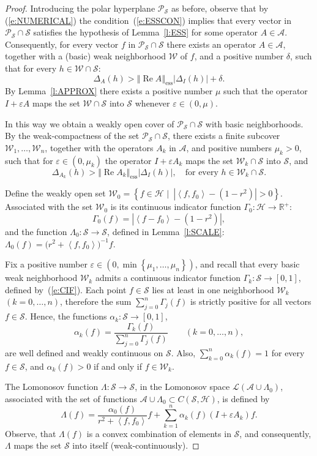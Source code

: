 \documentclass{tran-l}
\theoremstyle{definition}
\theoremstyle{remark}
\numberwithin{equation}{subsection}
\DeclareMathOperator{\RE}{Re}
\DeclareMathOperator{\ess}{ess}
\newcommand{\eps}{\varepsilon}
\newcommand{\To}{\longrightarrow}
\newcommand{\h}{\mathcal{H}}
\newcommand{\s}{\mathcal{S}}
\newcommand{\A}{\mathcal{A}}
\newcommand{\W}{\mathcal{W}}
\newcommand{\Real}{\mathbb{R}}
\newcommand{\RPlus}{\Real^{+}}
\newcommand{\Polar}{\mathcal{P}_{\s}}
\newcommand{\Lom}{\mathcal{L}}
\newcommand{\abs}[1]{\left\vert#1\right\vert}
\newcommand{\set}[1]{\left\{#1\right\}}
\newcommand{\seq}[1]{\left<#1\right>}
\newcommand{\norm}[1]{\left\Vert#1\right\Vert}
\newcommand{\essnorm}[1]{\norm{#1}_{\ess}}
\begin{document}
\begin{proof}
Introducing the polar hyperplane $\Polar$ as before, observe that by (\ref{e:NUMERICAL}) the condition~(\ref{e:ESSCON}) implies that every vector in $\Polar\cap\s$ satisfies the hypothesis of Lemma~\ref{l:ESS} for some operator $A\in\A$. Consequently, for every vector $f$ in $\Polar\cap\s$ there exists an operator $A\in\A$, together with a (basic) weak neighborhood $\W$ of $f$, and a positive number $\delta$, such that for every $h\in\W\cap\s$:
\[ \Delta_A(h) > \essnorm{\RE{A}}\abs{\Delta_I(h)} + \delta. \]
By Lemma~\ref{l:APPROX} there exists a positive number $\mu$ such that the operator $I+\eps A$ maps the set $\W\cap\s$ into $\s$ whenever $\eps\in(0,\mu)$.

In this way we obtain a weakly open cover of $\Polar\cap\s$ with basic neighborhoods. By the weak-compactness of the set $\Polar\cap\s$, there exists a finite subcover $\W_1,\ldots,\W_n$, together with the operators $A_k$ in $\A$, and positive numbers $\mu_k>0$, such that for $\eps\in(0,\mu_k)$ the operator $I+\eps{A_k}$ maps the set $\W_k\cap\s$ into $\s$, and
\begin{equation}\label{e:EINEQ}
  \Delta_{A_k}(h) > \essnorm{\RE{A_k}} \abs{\Delta_I(h)},
  \quad \text{for every $h\in\W_k\cap\s$}.
\end{equation}

Define the weakly open set $\W_0=\set{f\in\h\,\,|\,\,\,\abs{\seq{f,f_0}-(1-r^2)}>0}$. Associated with the set $\W_0$ is its continuous indicator function $\Gamma_0\colon\h\To\RPlus$:
\[ \Gamma_0(f)=\abs{\seq{f-f_0}-(1-r^2)}, \]
and the function $\Lambda_0\colon\s\To\s$, defined in Lemma~\ref{l:SCALE}: $\Lambda_0(f)=\big(r^2+\seq{f,f_0}\big)^{-1}f$.

Fix a positive number $\eps\in(0,\min\set{\mu_1,\ldots,\mu_n})$, and recall that every basic weak neighborhood $\W_k$ admits a continuous indicator function $\Gamma_k\colon\s\To[0,1]$, defined by~(\ref{e:CIF}). Each point $f\in\s$ lies at least in one neighborhood $\W_k$ $(k=0,\ldots,n)$, therefore the sum $\sum_{j=0}^n\Gamma_j(f)$ is strictly positive for all vectors $f\in\s$. Hence, the functions $\alpha_k\colon\s\To[0,1]$,
\[ \alpha_k(f) =
   \frac{\Gamma_k(f)}{\sum_{j=0}^n \Gamma_j(f)} \quad\quad
   (k=0,\ldots,n), \]
are well defined and weakly continuous on $\s$. Also, $\sum_{k=0}^n\alpha_k(f)=1$ for every $f \in \s$, and $\alpha_k(f)>0$ if and only if $f\in\W_k$.

The Lomonosov function $\Lambda\colon\s\To\s$, in the Lomonosov space $\Lom({\A\cup\Lambda_0})$, associated with the set of functions $\A\cup\Lambda_0\subset{C}(\s,\h)$, is defined by
\[ \Lambda(f) = \frac{\alpha_0(f)}{r^2+\seq{f,f_0}}
    f+\sum_{k=1}^n \alpha_k(f) (I+\eps A_k)f. \]
Observe, that $\Lambda(f)$ is a convex combination of elements in $\s$, and consequently, $\Lambda$ maps the set $\s$ into itself (weak-continuously).


\end{proof}
\end{document}
